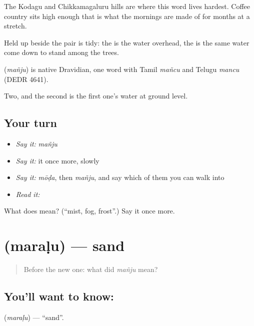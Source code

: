 The Kodagu and Chikkamagaluru hills are where this word lives hardest. Coffee country sits high enough that  is what the mornings are made of for months at a stretch.

Held up beside  the pair is tidy: the  is the water overhead, the  is the same water come down to stand among the trees.

\begin{cousinweb}
\textbf{} (\emph{mañju}) is native Dravidian, one word with Tamil \emph{mañcu} and Telugu \emph{mancu} (DEDR 4641).
\end{cousinweb}

\begin{grammarlens}[title={What you've built}]
Two, and the second is the first one's water at ground level.
\end{grammarlens}

\subsection*{Your turn}
\begin{itemize}
\raggedright
  \item \emph{Say it:} \emph{mañju}
  \item \emph{Say it:} it once more, slowly
  \item \emph{Say it:} \emph{mōḍa}, then \emph{mañju}, and say which of them you can walk into
  \item \emph{Read it:} \textbf{}
\end{itemize}

\begin{tcolorbox}[breakable,colback=teal!4,colframe=teal!35!black,title={Before you move on}]
What does  mean? (\textquotedblleft{}mist, fog, frost\textquotedblright{}.) Say it once more.
\end{tcolorbox}
\section[\texorpdfstring{\kn{ಮರಳು} (maraḷu)}{ಮರಳು (maraḷu)}]{ (maraḷu) — sand}

\label{lesson:KA-C59-sand}



\begin{quote}
Before the new one: what did \emph{mañju} mean?
\end{quote}

\subsection*{You'll want to know: }
\textbf{} (\emph{maraḷu}) — \textquotedblleft{}sand\textquotedblright{}.

